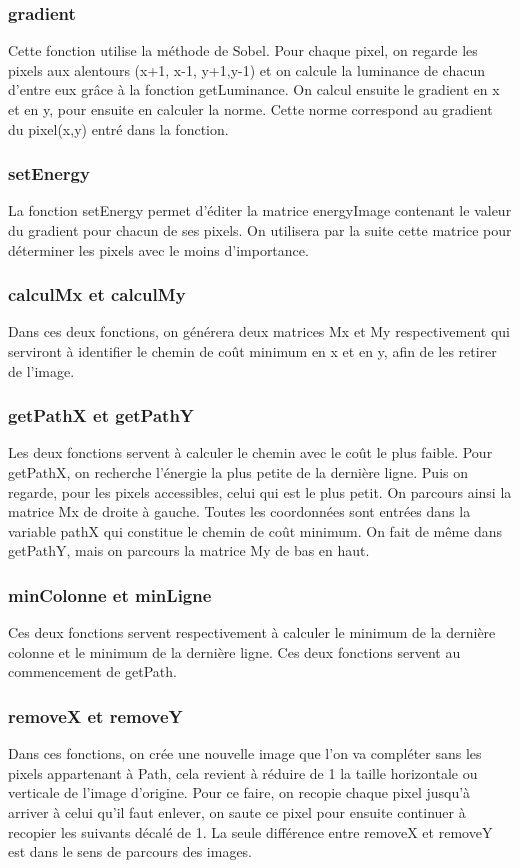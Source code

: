 \documentclass[12pt]{article}
\begin{document}
\subsubsection{gradient}
Cette fonction utilise la méthode de Sobel. Pour chaque pixel, on regarde les pixels aux alentours (x+1, x-1, y+1,y-1) et on calcule la luminance de chacun d'entre eux grâce à la fonction getLuminance.
On calcul ensuite le gradient en x et en y, pour ensuite en calculer la norme.
Cette norme correspond au gradient du pixel(x,y) entré dans la fonction.

\subsubsection{setEnergy}
La fonction setEnergy permet d'éditer la matrice energyImage contenant le valeur du gradient pour chacun de ses pixels.
On utilisera par la suite cette matrice pour déterminer les pixels avec le moins d'importance.

\subsubsection{calculMx et calculMy}
Dans ces deux fonctions, on générera deux matrices Mx et My respectivement qui serviront à identifier le chemin de coût minimum en x et en y, afin de les retirer de l'image.

\subsubsection{getPathX et getPathY}
Les deux fonctions servent à calculer le chemin avec le coût le plus faible. Pour getPathX, on recherche l'énergie la plus petite de la dernière ligne. Puis on regarde, pour les pixels accessibles, celui qui est le plus petit. On parcours ainsi la matrice Mx de droite à gauche. Toutes les coordonnées sont entrées dans la variable pathX qui constitue le chemin de coût minimum. On fait de même dans getPathY, mais on parcours la matrice My de bas en haut.

\subsubsection{minColonne et minLigne}
Ces deux fonctions servent respectivement à calculer le minimum de la dernière colonne et le minimum de la dernière ligne. Ces deux fonctions servent au commencement de getPath.

\subsubsection{removeX et removeY}
Dans ces fonctions, on crée une nouvelle image que l'on va compléter sans les pixels appartenant à Path, cela revient à réduire de 1 la taille horizontale ou verticale de l'image d'origine. Pour ce faire, on recopie chaque pixel jusqu'à arriver à celui qu'il faut enlever, on saute ce pixel pour ensuite continuer à recopier les suivants décalé de 1.
La seule différence entre removeX et removeY est dans le sens de parcours des images.
\end{document}
